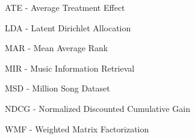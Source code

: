 ATE - Average Treatment Effect

LDA - Latent Dirichlet Allocation

MAR - Mean Average Rank

MIR - Music Information Retrieval

MSD - Million Song Dataset

NDCG - Normalized Discounted Cumulative Gain

WMF - Weighted Matrix Factorization